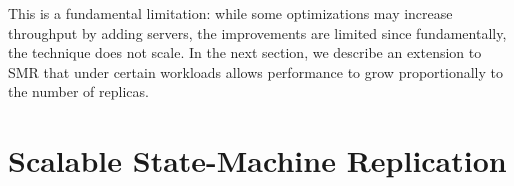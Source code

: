 \documentclass[10pt, conference, compsocconf, letterpaper]{IEEEtranv17}
\begin{document}

This is a fundamental limitation: while some optimizations may increase throughput by adding servers, the improvements are limited since fundamentally, the technique does not scale.
In the next section, we describe an extension to SMR that under certain workloads allows performance to grow proportionally to the number of replicas.






\section{Scalable State-Machine Replication}
\label{sec:scalablesmr}
\end{document}
